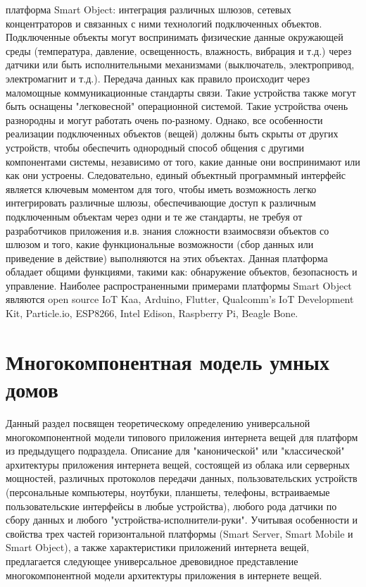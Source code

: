 \begin{textitemize}
	\item платформа Smart Object: интеграция различных шлюзов, сетевых концентраторов и связанных с ними технологий подключенных объектов. Подключенные объекты могут воспринимать физические данные окружающей среды (температура, давление, освещенность, влажность, вибрация и т.д.) через датчики или быть исполнительными механизмами (выключатель, электропривод, электромагнит и т.д.). Передача данных как правило происходит через маломощные коммуникационные стандарты связи. Такие устройства также могут быть оснащены "легковесной"{} операционной системой. Такие устройства очень разнородны и могут работать очень по-разному. Однако, все особенности реализации подключенных объектов (вещей) должны быть скрыты от других устройств, чтобы обеспечить однородный способ общения с другими компонентами системы, независимо от того, какие данные они воспринимают или как они устроены. Следовательно, единый объектный программный интерфейс является ключевым моментом для того, чтобы иметь возможность легко интегрировать различные шлюзы, обеспечивающие доступ к различным подключенным объектам через одни и те же стандарты, не требуя от разработчиков приложения и.в. знания сложности взаимосвязи объектов со шлюзом и того, какие функциональные возможности (сбор данных или приведение в действие) выполняются на этих объектах. Данная платформа обладает общими функциями, такими как: обнаружение объектов, безопасность и управление. Наиболее распространенными примерами платформы Smart Object являются open source IoT Kaa, Arduino, Flutter, Qualcomm’s IoT Development Kit, Particle.io, ESP8266, Intel Edison, Raspberry Pi, Beagle Bone.
\end{textitemize}


\section{Многокомпонентная модель умных домов}
\label{sec_multicomponent_SH_model}

Данный раздел посвящен теоретическому определению универсальной многокомпонентной модели типового приложения интернета вещей для платформ из предыдущего подраздела. Описание для "канонической"{} или "классической"{} архитектуры приложения интернета вещей, состоящей из облака или серверных мощностей, различных протоколов передачи данных, пользовательских устройств (персональные компьютеры, ноутбуки, планшеты, телефоны, встраиваемые пользовательские интерфейсы в любые устройства), любого рода датчики по сбору данных и любого "устройства-исполнители-руки"{}. Учитывая особенности и свойства трех частей горизонтальной платформы (Smart Server, Smart Mobile и Smart Object), а также характеристики приложений интернета вещей, предлагается следующее универсальное древовидное представление многокомпонентной модели архитектуры приложения в интернете вещей.

